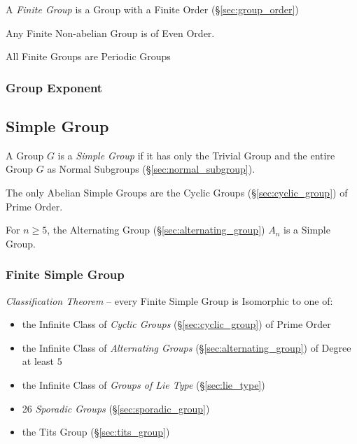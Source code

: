 A \emph{Finite Group} is a Group with a Finite Order (\S\ref{sec:group_order})

Any Finite Non-abelian Group is of Even Order.

All Finite Groups are Periodic Groups



\subsubsection{Group Exponent}\label{sec:group_exponent}



\subsection{Simple Group}\label{sec:simple_group}

A Group $G$ is a \emph{Simple Group} if it has only the Trivial Group and the
entire Group $G$ as Normal Subgroups (\S\ref{sec:normal_subgroup}).

The only Abelian Simple Groups are the Cyclic Groups
(\S\ref{sec:cyclic_group}) of Prime Order.

For $n \geq 5$, the Alternating Group (\S\ref{sec:alternating_group})
$A_n$ is a Simple Group.



\subsubsection{Finite Simple Group}\label{sec:finite_simple_group}

\emph{Classification Theorem} -- every Finite Simple Group is Isomorphic to one
of:
\begin{itemize}
  \item the Infinite Class of \emph{Cyclic Groups} (\S\ref{sec:cyclic_group}) of
    Prime Order
  \item the Infinite Class of \emph{Alternating Groups}
    (\S\ref{sec:alternating_group}) of Degree at least $5$
  \item the Infinite Class of \emph{Groups of Lie Type} (\S\ref{sec:lie_type})
  \item 26 \emph{Sporadic Groups} (\S\ref{sec:sporadic_group})
  \item the Tits Group (\S\ref{sec:tits_group})
\end{itemize}



